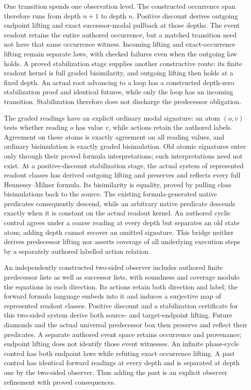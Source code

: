 \documentclass[11pt]{article}
\theoremstyle{definition}
\theoremstyle{remark}
\begin{document}
One transition spends one observation level.  The constructed occurrence
span therefore runs from depth $n+1$ to depth $n$.  Positive discount derives
outgoing endpoint lifting and exact successor-modal pullback at those
depths.  The event readout retains the entire authored occurrence, but a
matched transition need not have that same occurrence witness.  Incoming
lifting and exact-occurrence lifting remain separate laws, with checked
failures even when the outgoing law holds.  A proved stabilization stage
supplies another constructive route: its finite readout kernel is full
graded bisimilarity, and outgoing lifting then holds at a fixed depth.
An actual root advancing to a loop has a constructed depth-zero
stabilization proof and identical futures, while only the loop has an
incoming transition.  Stabilization therefore does not discharge the
predecessor obligation.

The graded readings have an explicit ordinary modal signature: an atom
$(o,v)$ tests whether reading $o$ has value $v$, while actions retain the
authored labels.  Agreement on these atoms is exactly agreement on all
reading values, and ordinary bisimulation is exactly graded bisimulation.
Old atomic signatures enter only through their proved formula interpretations;
such interpretations need not exist.  At a positive-discount stabilization
stage, the actual system of represented readout classes has derived outgoing
lifting and preserves and reflects every full Hennessy--Milner formula.
Its bisimilarity is equality, proved by pulling class bisimulations back to
the source.  The existing formula-generated native predicates consequently
descend, while an arbitrary native predicate descends exactly when it is
constant on the actual readout kernel.  An authored cyclic control agrees
under a coarse reading at every depth but separates an old state atom;
adding depth cannot recover an omitted signature.  This bridge neither
derives predecessor lifting nor asserts coverage of all underlying execution
steps by a separately authored labelled action relation.

An independently constructed two-sided observer includes authored finite
predecessor lists as well as successor lists, with soundness and coverage
modulo the equations in each direction.  Its actions retain both direction
and label; the forward formula language embeds into it and induces a
surjective map of represented readout classes.  Positive discount and a
stabilization certificate for this two-sided system derive both source-
and target-endpoint lifting.  Future diamonds and the actual universal
predecessor box then preserve and reflect their predicates.  A separate
authored event space retains occurrence and provenance; endpoint lifting
does not identify those event witnesses.  An infinite phase-cycle control
has both endpoint laws while refuting exact occurrence lifting.  A past
control has identical forward readings at every depth and is separated
at depth one by the two-sided observer.  Thus adding the past is an
explicit observer refinement with proved consequences.
\end{document}
